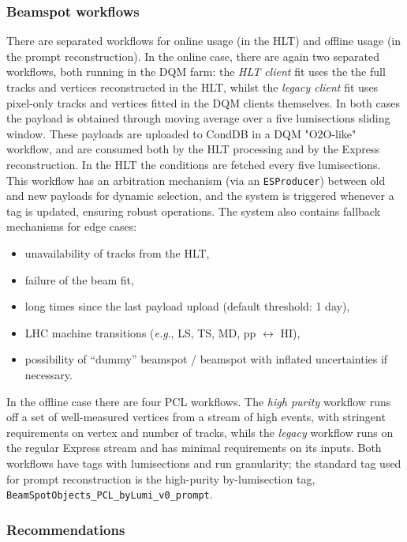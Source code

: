 \subsubsection{Beamspot workflows}

There are separated workflows for
online usage (in the HLT) and
offline usage (in the prompt reconstruction).
In the online case, there are again two separated workflows, both running in the DQM farm:
the \emph{HLT client} fit uses the the full tracks and vertices reconstructed in the HLT, whilst
the \emph{legacy client} fit uses pixel-only tracks and vertices fitted in the DQM clients themselves.
In both cases the payload is obtained through moving average over a five lumisections sliding window.
These payloads are uploaded to CondDB in a DQM "O2O-like" workflow,
and
are consumed both by the HLT processing and by the Express reconstruction.
In the HLT the conditions are fetched every five lumisections.
This workflow has an arbitration mechanism (via an \texttt{ESProducer}) between old and new payloads for dynamic selection, and the system is triggered whenever a tag is updated, ensuring robust operations.
The system also contains fallback mechanisms for edge cases:
\begin{itemize}
\item unavailability of tracks from the HLT,
\item failure of the beam fit,
\item long times since the last payload upload (default threshold: 1 day),
\item LHC machine transitions (\textit{e.g}., LS, TS, MD, pp $\leftrightarrow$ HI),
\item possibility of ``dummy'' beamspot / beamspot with inflated uncertainties if necessary.
\end{itemize}
In the offline case there are four PCL workflows.
The \emph{high purity} workflow runs off a set of well-measured vertices from a stream of high \HT events,
with stringent requirements on vertex \PT and number of tracks, whils
the \emph{legacy} workflow runs on the regular Express stream and has minimal requirements on its inputs.
Both workflows have tags with lumisections and run granularity;
the standard tag used for prompt reconstruction is the high-purity by-lumisection tag, \texttt{BeamSpotObjects\_PCL\_byLumi\_v0\_prompt}.

\subsubsection{Recommendations}

